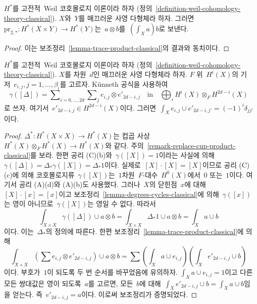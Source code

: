 \begin{lemma}
\label{lemma-pr2star-classical}
$H^*$를 고전적\  Weil 코호몰로지 이론이라 하자
(정의\  \ref{definition-weil-cohomology-theory-classical}).
$X$와\  $Y$를 매끄러운 사영 다형체라 하자. 그러면\ 
$\text{pr}_{2, *} : H^*(X \times Y) \to H^*(Y)$는\ 
$a \otimes b$를\  $(\int_X a) b$로 보낸다.
\end{lemma}

\begin{proof}
이는 보조정리\  \ref{lemma-trace-product-classical}의 결과와 동치이다.
\end{proof}

\begin{lemma}
\label{lemma-class-diagonal-classical}
$H^*$를 고전적\  Weil 코호몰로지 이론이라 하자
(정의\  \ref{definition-weil-cohomology-theory-classical}).
$X$를 차원\  $d$인 매끄러운 사영 다형체라 하자.
$F$ 위\  $H^i(X)$의 기저\  $e_{i, j}, j = 1, \ldots, \beta_i$를 고르자.
K\"unneth 공식을 사용하여
$$
\gamma([\Delta]) =
\sum\nolimits_{i = 0, \ldots, 2d}
\sum\nolimits_j e_{i, j} \otimes e'_{2d - i , j}
\quad\text{in}\quad
\bigoplus\nolimits_i H^i(X) \otimes_F H^{2d - i}(X)
$$
로 쓰자. 여기서\  $e'_{2d - i, j} \in H^{2d - i}(X)$이다.
그러면\  $\int_X e_{i, j} \cup e'_{2d - i, j'} = (-1)^i\delta_{jj'}$이다.
\end{lemma}

\begin{proof}
$\Delta^* : H^*(X \times X) \to H^*(X)$는 컵곱 사상\ 
$H^*(X) \otimes_F H^*(X) \to H^*(X)$와 같다. 주의\ 
\ref{remark-replace-cup-product-classical}를 보라.
한편 공리 (C)(b)와\  $\gamma([X]) = 1$이라는 사실에 의해\ 
$\gamma([\Delta]) = \Delta_*\gamma([X]) = \Delta_*1$이다.
실제로\  $[X] \cdot [X] = [X]$이므로 공리 (C)(c)에 의해
코호몰로지류\  $\gamma([X])$는\  $1$차원\  $F$-대수\  $H^0(X)$에서\ 
$0$ 또는\  $1$이다. 여기서 공리 (A)(d)와 (A)(b)도 사용했다.
그러나\  $X$의 닫힌점\  $x$에 대해\  $[X] \cdot [x] = [x]$이고
보조정리\  \ref{lemma-degrees-cycles-classical}에 의해\ 
$\gamma([x])$는 영이 아니므로\  $\gamma([X])$는 영일 수 없다. 따라서
$$
\int_{X \times X} \gamma([\Delta]) \cup a \otimes b =
\int_{X \times X} \Delta_*1 \cup a \otimes b =
\int_X a \cup b
$$
이다. 이는\  $\Delta_*$의 정의에 따른다. 한편 보조정리\ 
\ref{lemma-trace-product-classical}에 의해
$$
\int_{X \times X} (\sum e_{i, j} \otimes e'_{2d -i , j}) \cup a \otimes b =
\sum (\int_X a \cup e_{i, j})(\int_X e'_{2d - i, j} \cup b)
$$
이다. 부호가\  $1$이 되도록 두 번 순서를 바꾸었음에 유의하자.
$\int_X a \cup e_{i, j} = 1$이고 다른 모든 쌍대값은 영이 되도록\ 
$a$를 고르면, 모든\  $b$에 대해\ 
$\int_X e'_{2d - i, j} \cup b = \int_X a \cup b$임을 얻는다.
즉\  $e'_{2d - i, j} = a$이다. 이로써 보조정리가 증명되었다.
\end{proof}

